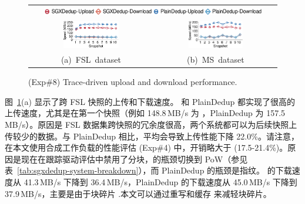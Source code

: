 \begin{figure}[t]
  \centering
  \begin{tabular}{@{\ }c@{\ }c}
  \multicolumn{2}{c}{\includegraphics[width=0.9\textwidth]{pic/sgxdedup/expb2_trace_legend.pdf}} \\
  \hspace{-0.1in}
  \includegraphics[width=0.47\textwidth]{pic/sgxdedup/expb2_trace_fsl_plain_sgx.pdf} &
  \includegraphics[width=0.47\textwidth]{pic/sgxdedup/expb2_trace_ms_plain_sgx.pdf}
  \vspace{-3pt}\\
  \mbox{\small (a) FSL dataset} &
  \mbox{\small (b) MS dataset}
  \end{tabular}
  \vspace{-6pt}
  \caption{(Exp\#8) Trace-driven upload and download performance.}
  \label{fig:sgxdedup-tracePerformance}
\end{figure}

图~\ref{fig:sgxdedup-tracePerformance}(a) 显示了跨 FSL 快照的上传和下载速度。 \sysnameS 和 PlainDedup 都实现了很高的上传速度，尤其是在第一个快照（例如 148.8\,MB/s \sysnameS 为 ，PlainDedup 为 157.5\,MB/s）。原因是 FSL 数据集跨快照的冗余度很高，两个系统都可以为后续快照上传较少的数据。与 PlainDedup 相比，\sysnameS 平均会导致上传性能下降 22.0\%。请注意，在本文使用合成工作负载的性能评估 (Exp\#4) 中，开销略大于 (17.5-21.4\%)。原因是现在在跟踪驱动评估中禁用了分块，\sysnameS 的瓶颈切换到 PoW（参见表~\ref{tab:sgxdedup-system-breakdown}），而 PlainDedup 的瓶颈是指纹。 \sysnameS 的下载速度从 41.3\,MB/s 下降到 36.4\,MB/s，PlainDedup 的下载速度从 45.0\,MB/s 下降到 37.9\,MB/s，主要是由于块碎片 \cite{lillibridge13} .本文可以通过重写和缓存 \cite{lillibridge13,cao18} 来减轻块碎片。

